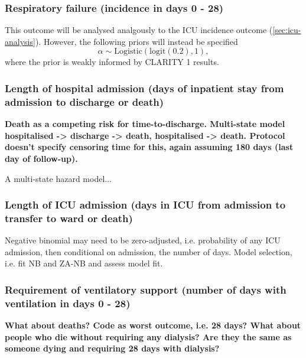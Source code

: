 \documentclass[11pt,parskip=half-]{scrartcl}
\begin{document}
\subsubsection{Respiratory failure (incidence in days 0 - 28)}
This outcome will be analysed analgously to the ICU incidence outcome (\ref{sec:icu-analysis}). However, the following priors will instead be specified
$$
    \alpha \sim \text{Logistic}(\text{logit}(0.2), 1),
$$
where the prior is weakly informed by CLARITY 1 results.

\subsubsection{Length of hospital admission (days of inpatient stay from admission to discharge or death)}

\textbf{Death as a competing risk for time-to-discharge. Multi-state model hospitalised -> discharge -> death, hospitalised -> death. Protocol doesn't specify censoring time for this, again assuming 180 days (last day of follow-up).}

A multi-state hazard model...

\subsubsection{Length of ICU admission (days in ICU from admission to transfer to ward or death)}
Negative binomial may need to be zero-adjusted, i.e. probability of any ICU admission, then conditional on admission, the number of days. Model selection, i.e. fit NB and ZA-NB and assess model fit.

\subsubsection{Requirement of ventilatory support (number of days with ventilation in days 0 - 28)}\label{sec:vent-support}

\textbf{What about deaths? Code as worst outcome, i.e. 28 days? What about people who die without requiring any dialysis? Are they the same as someone dying and requiring 28 days with dialysis?}
\end{document}
